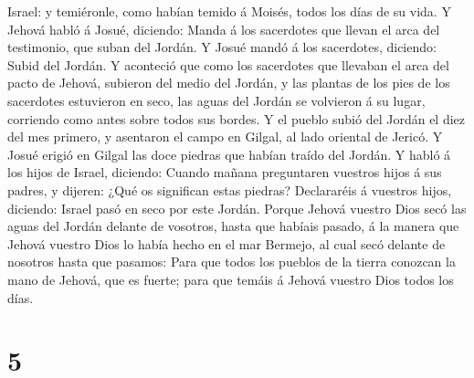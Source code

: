 Israel: y temiéronle, como habían temido á Moisés, todos los días de su
vida.  Y Jehová habló á Josué, diciendo: 
Manda á los sacerdotes que llevan el arca del testimonio, que suban del
Jordán.  Y Josué mandó á los sacerdotes, diciendo: Subid
del Jordán.  Y aconteció que como los sacerdotes que
llevaban el arca del pacto de Jehová, subieron del medio del Jordán, y
las plantas de los pies de los sacerdotes estuvieron en seco, las aguas
del Jordán se volvieron á su lugar, corriendo como antes sobre todos sus
bordes.  Y el pueblo subió del Jordán el diez del mes
primero, y asentaron el campo en Gilgal, al lado oriental de Jericó.
 Y Josué erigió en Gilgal las doce piedras que habían
traído del Jordán.  Y habló á los hijos de Israel,
diciendo: Cuando mañana preguntaren vuestros hijos á sus padres, y
dijeren: ¿Qué os significan estas piedras?  Declararéis á
vuestros hijos, diciendo: Israel pasó en seco por este Jordán.
 Porque Jehová vuestro Dios secó las aguas del Jordán
delante de vosotros, hasta que habíais pasado, á la manera que Jehová
vuestro Dios lo había hecho en el mar Bermejo, al cual secó delante de
nosotros hasta que pasamos:  Para que todos los pueblos de
la tierra conozcan la mano de Jehová, que es fuerte; para que temáis á
Jehová vuestro Dios todos los días.

\hypertarget{section-4}{%
\section{5}\label{section-4}}

